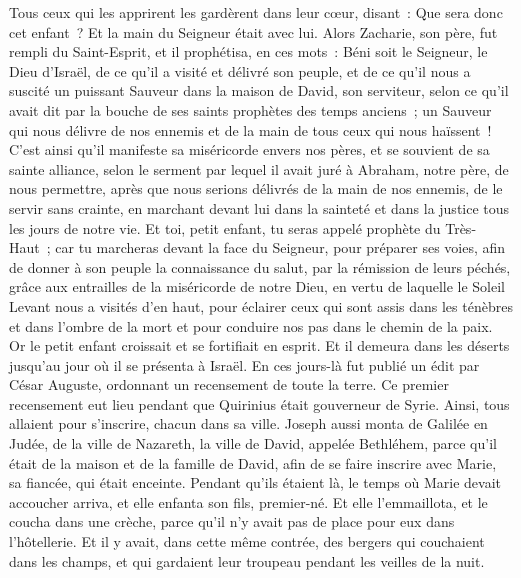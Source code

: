 \begin{multicols}{2}
Tous ceux qui les apprirent les gardèrent dans leur cœur, disant~: Que sera donc cet enfant~? Et la main du Seigneur était avec lui.
Alors Zacharie, son père, fut rempli du Saint-Esprit, et il prophétisa, en ces mots~:
Béni soit le Seigneur, le Dieu d'Israël, de ce qu'il a visité et délivré son peuple,
et de ce qu'il nous a suscité un puissant Sauveur dans la maison de David, son serviteur,
selon ce qu'il avait dit par la bouche de ses saints prophètes des temps anciens~;
un Sauveur qui nous délivre de nos ennemis et de la main de tous ceux qui nous haïssent~!
C'est ainsi qu'il manifeste sa miséricorde envers nos pères, et se souvient de sa sainte alliance,
selon le serment par lequel il avait juré à Abraham, notre père,
de nous permettre, après que nous serions délivrés de la main de nos ennemis, de le servir sans crainte,
en marchant devant lui dans la sainteté et dans la justice tous les jours de notre vie.
Et toi, petit enfant, tu seras appelé prophète du Très-Haut~; car tu marcheras devant la face du Seigneur, pour préparer ses voies,
afin de donner à son peuple la connaissance du salut, par la rémission de leurs péchés,
grâce aux entrailles de la miséricorde de notre Dieu, en vertu de laquelle le Soleil Levant nous a visités d'en haut,
pour éclairer ceux qui sont assis dans les ténèbres et dans l'ombre de la mort et pour conduire nos pas dans le chemin de la paix.
Or le petit enfant croissait et se fortifiait en esprit. Et il demeura dans les déserts jusqu'au jour où il se présenta à Israël.
\VerseOne{}En ces jours-là fut publié un édit par César Auguste, ordonnant un recensement de toute la terre.
Ce premier recensement eut lieu pendant que Quirinius était gouverneur de Syrie.
Ainsi, tous allaient pour s'inscrire, chacun dans sa ville.
Joseph aussi monta de Galilée en Judée, de la ville de Nazareth, la ville de David, appelée Bethléhem, parce qu'il était de la maison et de la famille de David,
afin de se faire inscrire avec Marie, sa fiancée, qui était enceinte.
Pendant qu'ils étaient là, le temps où Marie devait accoucher arriva,
et elle enfanta son fils, premier-né. Et elle l'emmaillota, et le coucha dans une crèche, parce qu'il n'y avait pas de place pour eux dans l'hôtellerie.
Et il y avait, dans cette même contrée, des bergers qui couchaient dans les champs, et qui gardaient leur troupeau pendant les veilles de la nuit.

\end{multicols}
